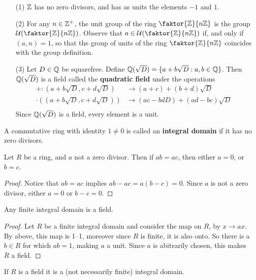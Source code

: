 \begin{example}\label{example_5.3}
  \begin{enumerate}
    \item[(1)] $\mathbb{Z}$ has no zero divisors, and has as units the elements $-1$
      and $1$.


    \item[(2)] For any $n \in \mathbb{Z}^+$, the unit group of the ring
      $\faktor{\Z}{n\Z}$ is the group $\Uc{(\faktor{\Z}{n\Z})}$.
      Observe that $a \in \Uc{(\faktor{\Z}{n\Z})}$ if, and only if
      $(a,n)=1$, so that the group of units of the ring
      $\faktor{\Z}{n\Z}$ coincides with the group definition.

    \item[(3)] Let $D \in \mathbb{Q}$ be squarefree. Define
      $\mathbb{Q}(\sqrt{D})=\{a+b\sqrt{D} : a,b \in \mathbb{Q}\}$. Then $\mathbb{Q}(\sqrt{D})$ is
      a field called the \textbf{quadratic field} under the operations
      \begin{align*}
        +:(a+b\sqrt{D}, c+d\sqrt{D})    & \xrightarrow{} (a+c)+(b+d)\sqrt{D} \\
        \cdot((a+b\sqrt{D}, c+d\sqrt{D}))   &   \xrightarrow{}
        (ac-bdD)+(ad-bc)\sqrt{D} \\
      \end{align*}
      Since $\mathbb{Q}(\sqrt{D})$ is a field, every element is a unit.
  \end{enumerate}
\end{example}

\begin{definition}
  A commutative ring with identity $1 \neq 0$ is called an \textbf{integral
  domain} if it has no zero divisors.
\end{definition}

\begin{proposition}\label{proposition_5.1.3}
  Let $R$ be a ring, and $a$ not a zero divisor. Then if $ab=ac$, then either
  $a=0$, or  $b=c$.
\end{proposition}
\begin{proof}
  Notice that $ab=ac$ implies  $ab-ac=a(b-c)=0$. Since $a$ is not a zero
  divisor, either  $a=0$ or  $b-c=0$.
\end{proof}
\begin{corollary}
  Any finite integral domain is a field.
\end{corollary}
\begin{proof}
  Let $R$ be a finite integral domain and consider the map on $R$, by $x
  \xrightarrow{} ax$. By above, this map is 1--1, moreover since $R$ is
  finite, it is also onto. So there is a $b \in R$ for which $ab=1$, making
  $a$ a unit. Since $a$ is abitrarily chosen, this makes $R$ a field.
\end{proof}
\begin{corollary}
  If $R$ is a field it is a (not necessarily finite) integral domain.
\end{corollary}

